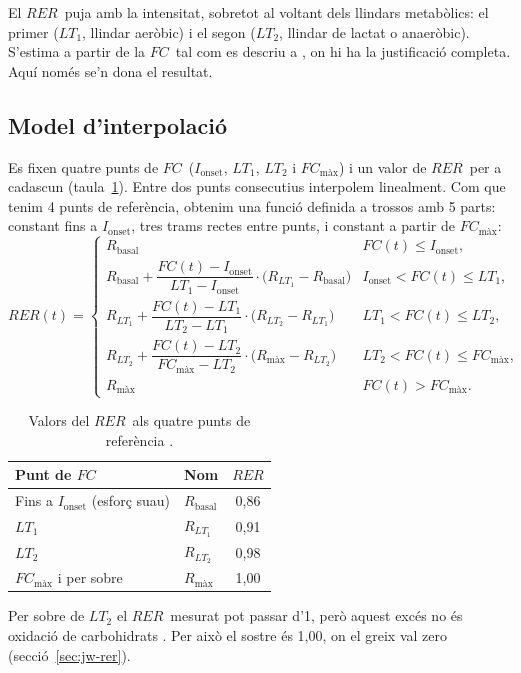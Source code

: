 \documentclass[10pt,a4paper]{article}
\newcommand{\smax}{{\scriptscriptstyle\text{màx}}}
\newcommand{\RER}{\ensuremath{\mathit{RER}}}
\newcommand{\FC}{\ensuremath{\mathit{FC}}}
\newcommand{\FCmax}{\ensuremath{\mathit{FC}_{\smax}}}
\newcommand{\Ion}{\ensuremath{I_{\mathrm{onset}}}}
\begin{document}
El \RER\ puja amb la intensitat, sobretot al voltant dels llindars metabòlics: el primer
($LT_1$, llindar aeròbic) i el segon ($LT_2$, llindar de lactat o anaeròbic). S'estima a
partir de la \FC\ tal com es descriu a \citep{chofatfc2026}, on hi ha la justificació
completa. Aquí només se'n dona el resultat.

\subsection{Model d'interpolació}
Es fixen quatre punts de \FC\ ($\Ion$, $LT_1$, $LT_2$ i $\FCmax$) i un valor de \RER\ per a
cadascun (taula~\ref{tab:ancoratges}). Entre dos punts consecutius interpolem linealment.
Com que tenim 4 punts de referència, obtenim una funció definida a trossos amb 5 parts:
constant fins a $\Ion$, tres trams rectes entre punts, i constant a partir de $\FCmax$:
\begin{equation}
\RER(t)=
\begin{cases}
R_{\mathrm{basal}} & \FC(t)\le\Ion,\\[4pt]
R_{\mathrm{basal}}+\dfrac{\FC(t)-\Ion}{LT_1-\Ion}\cdot\bigl(R_{LT_1}-R_{\mathrm{basal}}\bigr) & \Ion<\FC(t)\le LT_1,\\[10pt]
R_{LT_1}+\dfrac{\FC(t)-LT_1}{LT_2-LT_1}\cdot\bigl(R_{LT_2}-R_{LT_1}\bigr) & LT_1<\FC(t)\le LT_2,\\[10pt]
R_{LT_2}+\dfrac{\FC(t)-LT_2}{\FCmax-LT_2}\cdot\bigl(R_{\smax}-R_{LT_2}\bigr) & LT_2<\FC(t)\le\FCmax,\\[6pt]
R_{\smax} & \FC(t)>\FCmax.
\end{cases}
\label{eq:rer}
\end{equation}

\begin{table}[H]
\centering
\caption{Valors del \RER\ als quatre punts de referència \citep{chofatfc2026}.}
\label{tab:ancoratges}
\small
\begin{tabular}{@{}llc@{}}
\toprule
Punt de \FC & Nom & \RER \\
\midrule
Fins a $\Ion$ (esforç suau) & $R_{\mathrm{basal}}$ & 0,86 \\
$LT_1$ & $R_{LT_1}$ & 0,91 \\
$LT_2$ & $R_{LT_2}$ & 0,98 \\
$\FCmax$ i per sobre & $R_{\smax}$ & 1,00 \\
\bottomrule
\end{tabular}
\end{table}

Per sobre de $LT_2$ el \RER\ mesurat pot passar d'1, però aquest excés no és oxidació de
carbohidrats \citep{chofatfc2026}. Per això el sostre és 1,00, on el greix val zero
(secció~\ref{sec:jw-rer}).
\end{document}
